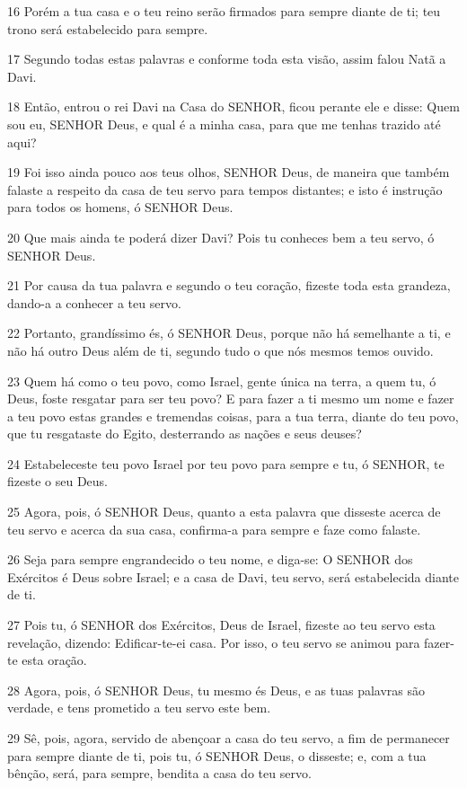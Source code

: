\par 16 Porém a tua casa e o teu reino serão firmados para sempre diante de ti; teu trono será estabelecido para sempre.
\par 17 Segundo todas estas palavras e conforme toda esta visão, assim falou Natã a Davi.
\par 18 Então, entrou o rei Davi na Casa do SENHOR, ficou perante ele e disse: Quem sou eu, SENHOR Deus, e qual é a minha casa, para que me tenhas trazido até aqui?
\par 19 Foi isso ainda pouco aos teus olhos, SENHOR Deus, de maneira que também falaste a respeito da casa de teu servo para tempos distantes; e isto é instrução para todos os homens, ó SENHOR Deus.
\par 20 Que mais ainda te poderá dizer Davi? Pois tu conheces bem a teu servo, ó SENHOR Deus.
\par 21 Por causa da tua palavra e segundo o teu coração, fizeste toda esta grandeza, dando-a a conhecer a teu servo.
\par 22 Portanto, grandíssimo és, ó SENHOR Deus, porque não há semelhante a ti, e não há outro Deus além de ti, segundo tudo o que nós mesmos temos ouvido.
\par 23 Quem há como o teu povo, como Israel, gente única na terra, a quem tu, ó Deus, foste resgatar para ser teu povo? E para fazer a ti mesmo um nome e fazer a teu povo estas grandes e tremendas coisas, para a tua terra, diante do teu povo, que tu resgataste do Egito, desterrando as nações e seus deuses?
\par 24 Estabeleceste teu povo Israel por teu povo para sempre e tu, ó SENHOR, te fizeste o seu Deus.
\par 25 Agora, pois, ó SENHOR Deus, quanto a esta palavra que disseste acerca de teu servo e acerca da sua casa, confirma-a para sempre e faze como falaste.
\par 26 Seja para sempre engrandecido o teu nome, e diga-se: O SENHOR dos Exércitos é Deus sobre Israel; e a casa de Davi, teu servo, será estabelecida diante de ti.
\par 27 Pois tu, ó SENHOR dos Exércitos, Deus de Israel, fizeste ao teu servo esta revelação, dizendo: Edificar-te-ei casa. Por isso, o teu servo se animou para fazer-te esta oração.
\par 28 Agora, pois, ó SENHOR Deus, tu mesmo és Deus, e as tuas palavras são verdade, e tens prometido a teu servo este bem.
\par 29 Sê, pois, agora, servido de abençoar a casa do teu servo, a fim de permanecer para sempre diante de ti, pois tu, ó SENHOR Deus, o disseste; e, com a tua bênção, será, para sempre, bendita a casa do teu servo.

